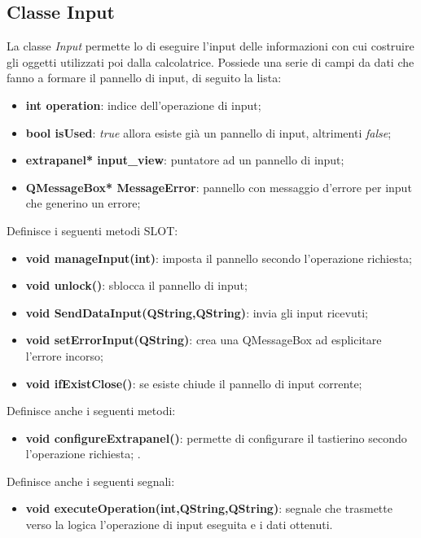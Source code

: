 \documentclass[a4paper,10pt]{article}
\begin{document}
        \subsection{Classe Input}
        La classe \textit{Input} permette lo di eseguire l'input delle informazioni con cui costruire gli oggetti utilizzati poi dalla calcolatrice.
        Possiede una serie di campi da dati che fanno a formare il pannello di input, di seguito la lista:
        \begin{itemize}
            \item \textbf{int operation}: indice dell'operazione di input;
            \item \textbf{bool isUsed}: \textit{true} allora esiste già un pannello di input, altrimenti \textit{false};
            \item \textbf{extrapanel* input\_view}: puntatore ad un pannello di input;
            \item \textbf{QMessageBox* MessageError}: pannello con messaggio d'errore per input che generino un errore;
        \end{itemize}
        Definisce i seguenti metodi SLOT:
        \begin{itemize}
            \item \textbf{void manageInput(int)}: imposta il pannello secondo l'operazione richiesta;
            \item \textbf{void unlock()}: sblocca il pannello di input;
            \item \textbf{void SendDataInput(QString,QString)}: invia gli input ricevuti;
            \item \textbf{void setErrorInput(QString)}: crea una QMessageBox ad esplicitare l'errore incorso;
            \item \textbf{void ifExistClose()}: se esiste chiude il pannello di input corrente;
        \end{itemize}
        Definisce anche i seguenti metodi:
        \begin{itemize}
            \item \textbf{void configureExtrapanel()}: permette di configurare il tastierino secondo l'operazione richiesta;   .       
        \end{itemize}
        Definisce anche i seguenti segnali:
        \begin{itemize}
            \item \textbf{void executeOperation(int,QString,QString)}: segnale che trasmette verso la logica l'operazione di input eseguita e i dati ottenuti.
        \end{itemize}
\end{document}

